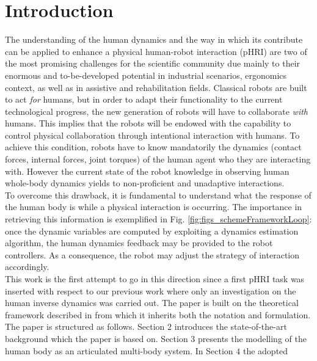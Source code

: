 
\section{Introduction}
%
The understanding of the human dynamics and the way in which its contribute
 can be applied to enhance a physical
 human-robot interaction (pHRI) are two of the most promising challenges for the scientific
  community due mainly to their enormous and to-be-developed potential in industrial scenarios,
   ergonomics context, as well as in assistive and rehabilitation fields. 
Classical robots are built to act \emph{for} humans, but in order to adapt their functionality
 to the current technological progress, the new generation of robots will have to collaborate
  \emph{with} humans.  This implies that the robots will be endowed with the capability to
   control physical collaboration through intentional interaction with humans.
To achieve this condition, robots have to know mandatorily the dynamics (contact forces, internal forces,
  joint torques) of
  the human agent who they are interacting with.  However the current state of the robot 
  knowledge in
   observing human whole-body dynamics  yields to non-proficient and unadaptive interactions.
   		\\	   	   
   \indent
  To overcome this drawback, it is fundamental to understand what
   the response of the human body is while a physical interaction is
    occurring.  The importance in retrieving this information is exemplified in Fig.
	 \ref{fig:figs_schemeFrameworkLoop}: once the dynamic variables are computed by 
	 exploiting a dynamics estimation algorithm, the human dynamics feedback 
	 may be provided to the robot
	   controllers. As a consequence, the robot may adjust the strategy of interaction accordingly.
		\\	   	   
\indent
This work is the first attempt to go in this direction since a first pHRI task was
 inserted with respect to our previous work \cite{LatellaSensors2016} where only an
  investigation on the human inverse dynamics was carried out. The paper is built on the
   theoretical framework described in \cite{LatellaSensors2016} from which it inherits 
   both the notation and formulation.
   \\  
   \indent
The paper is structured as follows.  Section $2$ introduces the state-of-the-art background 
which the paper is based on.  Section $3$ presents the modelling of the human
body as an articulated multi-body system. In Section $4$ the adopted
